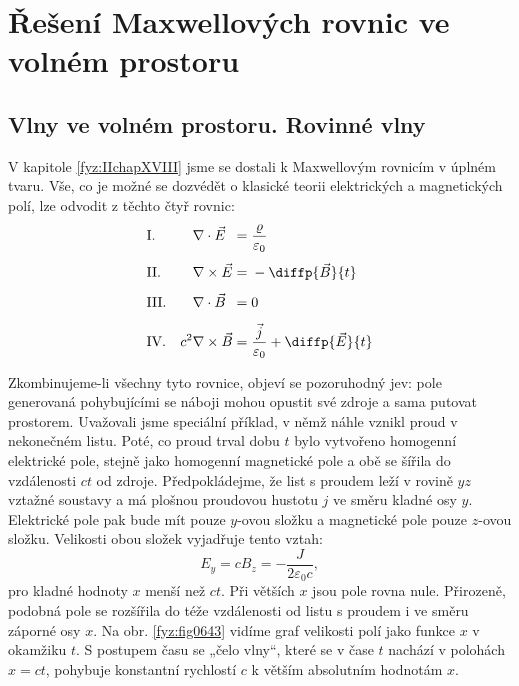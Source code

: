\setchaptertoc
\chapter{Řešení Maxwellových rovnic ve volném prostoru}\label{fyz:IIchapXX}

  \section{Vlny ve volném prostoru. Rovinné vlny}\label{fyz:IIchapXXsecI} 
  
    V kapitole \ref{fyz:IIchapXVIII} jsme se dostali k Maxwellovým rovnicím v úplném tvaru. Vše, co
    je možné se dozvédět o klasické teorii elektrických a magnetických polí, lze odvodit z těchto
    čtyř rovnic:
    \begin{equation}\label{fyz:eq963}
      \begin{alignedat}{3}
        &\text{I.}  &&\nabla\cdot \vec{E}          &\;=&\;\frac{\varrho}{\varepsilon_0}\\[1ex]
        &\text{II.} &&\nabla\times\vec{E}          &\;=&\;-\diffp{\vec{B}}{t}\\[1ex]
        &\text{III.}&&\nabla\cdot \vec{B}          &\;=&\;0\\[1ex]
        &\text{IV.}  &\quad c^2&\nabla\times\vec{B}&\;=&\;\frac{\vec{j}}{\varepsilon_0}+\diffp{\vec{E}}{t}
      \end{alignedat}
    \end{equation}

    Zkombinujeme-li všechny tyto rovnice, objeví se pozoruhodný jev: pole generovaná pohybujícími se
    náboji mohou opustit své zdroje a sama putovat prostorem. Uvažovali jsme speciální příklad, v
    němž náhle vznikl proud v nekonečném listu. Poté, co proud trval dobu \(t\) bylo vytvořeno
    homogenní elektrické pole, stejně jako homogenní magnetické pole a obě se šířila do vzdálenosti
    \(ct\) od zdroje. Předpokládejme, že list s proudem leží v rovině \(yz\) vztažné soustavy a má
    plošnou proudovou hustotu \(j\) ve směru kladné osy \(y\). Elektrické pole pak bude mít pouze
    \(y\)-ovou složku a magnetické pole pouze \(z\)-ovou složku. Velikosti obou složek vyjadřuje
    tento vztah:
    \begin{equation}\label{fyz:eq964}
      E_y=cB_z=-\frac{J}{2\varepsilon_0 c},
    \end{equation}
    pro kladné hodnoty \(x\) menší než \(ct\). Při větších \(x\) jsou pole rovna nule. Přirozeně,
    podobná pole se rozšířila do téže vzdálenosti od listu s proudem i ve směru záporné osy \(x\).
    Na obr. \ref{fyz:fig0643} vidíme graf velikosti polí jako funkce \(x\) v okamžiku \(t\). S
    postupem času se „čelo vlny“, které se v čase \(t\) nachází v polohách \(x = ct\), pohybuje
    konstantní rychlostí \(c\) k větším absolutním hodnotám \(x\).

